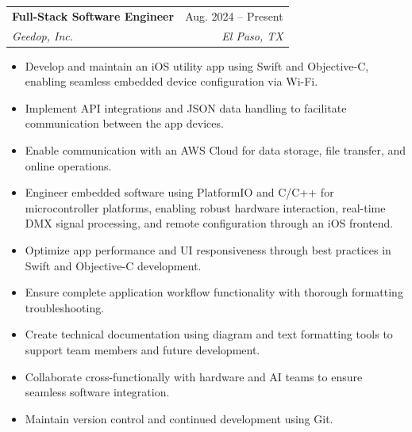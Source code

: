 \documentclass[letterpaper,11pt]{article}
\makeatletter
\newcommand{\resumeItem}[1]{
  \item\small{
    {#1 \vspace{-2pt}}
  }
}
\newcommand{\resumeSubheading}[4]{
  \vspace{-2pt}\item
    \begin{tabular*}{0.97\textwidth}[t]{l@{\extracolsep{\fill}}r}
      \textbf{#1} & #2 \\
      \textit{\small#3} & \textit{\small #4} \\
    \end{tabular*}\vspace{-7pt}
}
\newcommand{\resumeSubSubheading}[2]{
    \item
    \begin{tabular*}{0.97\textwidth}{l@{\extracolsep{\fill}}r}
      \textit{\small#1} & \textit{\small #2} \\
    \end{tabular*}\vspace{-7pt}
}
\newcommand{\resumeSubHeadingListEnd}{\end{itemize}}
\newcommand{\resumeItemListStart}{\begin{itemize}}
\newcommand{\resumeItemListEnd}{\end{itemize}\vspace{-5pt}}
\makeatother
\begin{document}

\resumeSubheading
{Full-Stack Software Engineer}{Aug. 2024 -- Present}
{Geedop, Inc.}{El Paso, TX}
\resumeItemListStart
  \resumeItem{Develop and maintain an iOS utility app using Swift and Objective-C, enabling seamless embedded device configuration via Wi-Fi.}
  \resumeItem{Implement API integrations and JSON data handling to facilitate communication between the app devices.}
  \resumeItem{Enable communication with an AWS Cloud for data storage, file transfer, and online operations.}
  \resumeItem{Engineer embedded software using PlatformIO and C/C++ for microcontroller platforms, enabling robust hardware interaction, real-time DMX signal processing, and remote configuration through an iOS frontend.}
  \resumeItem{Optimize app performance and UI responsiveness through best practices in Swift and Objective-C development.}
  \resumeItem{Ensure complete application workflow functionality with thorough formatting troubleshooting.}
  \resumeItem{Create technical documentation using diagram and text formatting tools to support team members and future development.}
  \resumeItem{Collaborate cross-functionally with hardware and AI teams to ensure seamless software integration.}
  \resumeItem{Maintain version control and continued development using Git.}
\resumeItemListEnd


\end{document}
